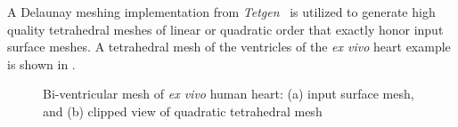 A Delaunay meshing implementation from \textit{Tetgen}~\cite{tetgen} is utilized to generate high quality tetrahedral meshes of linear or quadratic order that exactly honor input surface meshes. A tetrahedral mesh of the ventricles of the \textit{ex vivo} heart example is shown in .

\begin{figure}
\centering
{}
%
\caption{Bi-ventricular mesh of \textit{ex vivo} human heart: (a) input surface mesh, and (b) clipped view of quadratic tetrahedral mesh}
\label{fig:tetmesh}
\end{figure}

